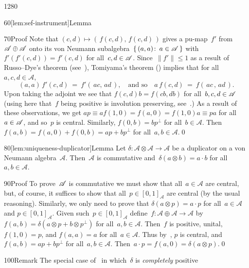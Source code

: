 \begin{parsec}{1280}
\begin{point}{60}[lem:sef-instrument]{Lemma}
\begin{point}{70}{Proof}
Note that $(c,d)\mapsto (\,f(c,d),\,f(c,d)\,)$
gives a pu-map~$f'$ from~$\mathscr{A}\oplus \mathscr{A}$
onto its von Neumann subalgebra~$\{\,(a,a)\colon\,a\in\mathscr{A}\,\}$
with~$f'(f'(c,d))=f'(c,d)$ for all~$c,d\in\mathscr{A}$.
Since~$\|f'\|\leq 1$ as a result of Russo--Dye's theorem 
(see~),
Tomiyama's theorem () 
implies that 
for all~$a,c,d\in\mathscr{A}$,
\begin{equation*}
	(a,a)\,f'(c,d)
	\ =\  f'(\,ac,\, ad\,),
	\quad\text{and so}\quad
a \,f(c,d) \ = \ f(\,ac\,,\,ad\,).
\end{equation*}
Upon taking the adjoint
we see that $f(c,d)b=f(cb,db)$
for all~$b,c,d\in\mathscr{A}$
(using here that~$f$ being positive is involution preserving,
see~.)
As a result of these observations, we get
 $ap\equiv af(1,0)=f(a,0)=f(1,0)a\equiv pa$
 for all~$a\in\mathscr{A}$,
and so~$p$ is central.
Similarly, $f(0,b)=bp^\perp$
for all~$b\in\mathscr{A}$.
Then~$f(a,b)=f(a,0)+f(0,b)=ap+bp^\perp$
for all~$a,b\in\mathscr{A}$.\qed
\end{point}
\end{point}
\begin{point}{80}[lem:uniqueness-duplicator]{Lemma}%
Let $\delta\colon\mathscr{A}\otimes \mathscr{A}\to\mathscr{A}$
be a duplicator on a von Neumann algebra~$\mathscr{A}$.
Then~$\mathscr{A}$ is commutative and~$\delta(a\otimes b)=a\cdot b$
for all~$a,b\in\mathscr{A}$.%
\begin{point}{90}{Proof}%
To prove~$\mathscr{A}$ is commutative
we must show that all~$a\in\mathscr{A}$ are central,
but, of course,
it suffices
to show that all~$p\in [0,1]_\mathscr{A}$ are central
(by the usual reasoning).
Similarly, 
we only need to prove that $\delta(a\otimes p) = a\cdot p$
for all~$a\in\mathscr{A}$ and $p\in [0,1]_\mathscr{A}$.
Given such~$p\in[0,1]_\mathscr{A}$ 
define~$f\colon \mathscr{A}\oplus\mathscr{A}\to\mathscr{A}$
by $f(a,b) = \delta(a\otimes p+b\otimes p^\perp)$
for all~$a,b\in\mathscr{A}$.
Then~$f$ is positive, unital,
$f(1,0)=p$,
and 
$f(a,a)=a$
for all~$a\in \mathscr{A}$.
Thus by~,
$p$ is central,
and  $f(a,b)=ap+bp^\perp$ for all~$a,b\in\mathscr{A}$.
Then~$a\cdot p=f(a,0)=\delta(a \otimes p)$.\qed
\end{point}
\end{point}
\begin{point}{100}{Remark}%
The special
case of~
in which~$\delta$ is \emph{completely} positive

\end{point}
\end{parsec}
